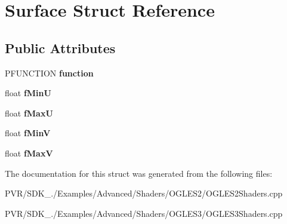 \hypertarget{struct_surface}{\section{Surface Struct Reference}
\label{struct_surface}
}
\subsection*{Public Attributes}
\begin{DoxyCompactItemize}
\item 
\hypertarget{struct_surface_a39f50c74a035b651ec355fb602c64f67}{P\+F\+U\+N\+C\+T\+I\+O\+N {\bfseries function}}\label{struct_surface_a39f50c74a035b651ec355fb602c64f67}

\item 
\hypertarget{struct_surface_a9b2c37fb1ca38db1e4d6ae25f902f67d}{float {\bfseries f\+Min\+U}}\label{struct_surface_a9b2c37fb1ca38db1e4d6ae25f902f67d}

\item 
\hypertarget{struct_surface_a5a25b96f733e833eb97cfc49e1cda7cf}{float {\bfseries f\+Max\+U}}\label{struct_surface_a5a25b96f733e833eb97cfc49e1cda7cf}

\item 
\hypertarget{struct_surface_a196114781735e1a2b3fc4e942460afb7}{float {\bfseries f\+Min\+V}}\label{struct_surface_a196114781735e1a2b3fc4e942460afb7}

\item 
\hypertarget{struct_surface_ae8dca527437873401bcc57dd53bbfa0e}{float {\bfseries f\+Max\+V}}\label{struct_surface_ae8dca527437873401bcc57dd53bbfa0e}

\end{DoxyCompactItemize}


The documentation for this struct was generated from the following files\+:\begin{DoxyCompactItemize}
\item 
P\+V\+R/\+S\+D\+K\+\_./\+Examples/\+Advanced/\+Shaders/\+O\+G\+L\+E\+S2/O\+G\+L\+E\+S2\+Shaders.\+cpp\item 
P\+V\+R/\+S\+D\+K\+\_./\+Examples/\+Advanced/\+Shaders/\+O\+G\+L\+E\+S3/O\+G\+L\+E\+S3\+Shaders.\+cpp\end{DoxyCompactItemize}
